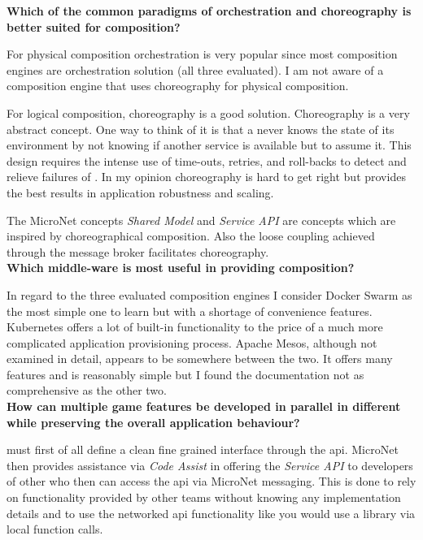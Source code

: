\noindent
\textbf{Which of the common paradigms of orchestration and choreography is
better suited for \ms{} composition?}

For physical composition orchestration is very popular since most composition
engines are orchestration solution (all three evaluated). I am not aware of a
composition engine that uses choreography for physical composition. 

For logical composition, choreography is a good solution. Choreography is a very
abstract concept. One way to think of it is that a \ms{} never knows the state
of its environment by not knowing if another service is available but to assume
it. This design requires the intense use of time-outs, retries, and roll-backs
to detect and relieve failures of \mss{}. In my opinion choreography is hard to
get right but provides the best results in application robustness and scaling.

The MicroNet concepts \textit{Shared Model} and \textit{Service API} are
concepts which are inspired by choreographical composition. Also the loose
coupling achieved through the message broker facilitates choreography.\\

\noindent
\textbf{Which middle-ware is most useful in providing \ms{} composition?}

In regard to the three evaluated composition engines I consider Docker Swarm as
the most simple one to learn but with a shortage of convenience features.
Kubernetes offers a lot of built-in functionality to the price of a much more
complicated application provisioning process. Apache Mesos, although not
examined in detail, appears to be somewhere between the two. It offers many
features and is reasonably simple but I found the documentation not as
comprehensive as the other two.\\

\noindent
\textbf{How can multiple game features be developed in parallel in different
\mss{} while preserving the overall application behaviour?}

\mss{} must first of all define a clean fine grained interface through the
\gls{api}. MicroNet then provides assistance via \textit{Code Assist} in
offering the \textit{Service API} to developers of other \mss{} who then can
access the \gls{api} via MicroNet messaging. This is done to rely on
functionality provided by other \ms{} teams without knowing any implementation
details and to use the networked \gls{api} functionality like you would use a
library via local function calls.

